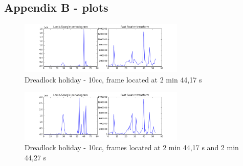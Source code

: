 \documentclass[letterpaper]{article}
\begin{document}
\subsection{Appendix B - plots}

\begin{figure}[h!]
\begin{center}
\includegraphics[width=3.1in,angle=0]{imgs/1frame.png}
\caption{Dreadlock holiday - 10cc, frame located at 2 min 44,17 s}
\label{}
\end{center}
\end{figure}

\begin{figure}[h!]
\begin{center}
\includegraphics[width=3.1in,angle=0]{imgs/2frames.png}
\caption{Dreadlock holiday - 10cc, frames located at 2 min 44,17 s and 2 min 44,27 s}
\label{}
\end{center}
\end{figure}
\end{document}

